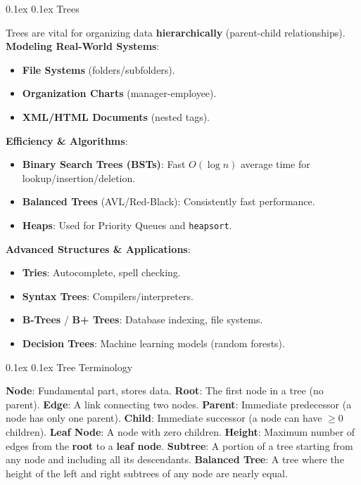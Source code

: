 \documentclass[8pt,landscape]{article}
\makeatletter
\renewcommand{\subsection}{\@startsection{subsection}{2}{0pt}%
    {0.1ex}%
    {0.1ex}%
    {\fontsize{8}{9}\bfseries\color{blue}}} %
\newcommand{\code}[1]{\textcolor{myred}{\texttt{#1}}}
\newcommand{\smalltext}[1]{%
  {\fontsize{8}{9}\selectfont\sloppy #1\par}%
}
\makeatother
\begin{document}
\begin{multicols}{3}
\subsection{Trees}
\smalltext{
Trees are vital for organizing data \textbf{hierarchically} (parent-child relationships).
\textbf{Modeling Real-World Systems}:
\begin{itemize}[noitemsep, nolistsep, leftmargin=1em]
    \item \textbf{File Systems} (folders/subfolders).
    \item \textbf{Organization Charts} (manager-employee).
    \item \textbf{XML/HTML Documents} (nested tags).
\end{itemize}
\textbf{Efficiency \& Algorithms}:
\begin{itemize}[noitemsep, nolistsep, leftmargin=1em]
    \item \textbf{Binary Search Trees (BSTs)}: Fast $O(\log n)$ average time for lookup/insertion/deletion.
    \item \textbf{Balanced Trees} (AVL/Red-Black): Consistently fast performance.
    \item \textbf{Heaps}: Used for Priority Queues and \code{heapsort}.
\end{itemize}
\textbf{Advanced Structures \& Applications}:
\begin{itemize}[noitemsep, nolistsep, leftmargin=1em]
    \item \textbf{Tries}: Autocomplete, spell checking.
    \item \textbf{Syntax Trees}: Compilers/interpreters.
    \item \textbf{B-Trees} / \textbf{B+ Trees}: Database indexing, file systems.
    \item \textbf{Decision Trees}: Machine learning models (random forests).
\end{itemize}
}
\subsection{Tree Terminology}
\smalltext{
\textbf{Node}: Fundamental part, stores data.
\textbf{Root}: The first node in a tree (no parent).
\textbf{Edge}: A link connecting two nodes.
\textbf{Parent}: Immediate predecessor (a node has only one parent).
\textbf{Child}: Immediate successor (a node can have $\geq 0$ children).
\textbf{Leaf Node}: A node with zero children.
\textbf{Height}: Maximum number of edges from the \textbf{root} to a \textbf{leaf node}.
\textbf{Subtree}: A portion of a tree starting from any node and including all its descendants.
\textbf{Balanced Tree}: A tree where the height of the left and right subtrees of any node are nearly equal.
}


\end{multicols}
\end{document}
